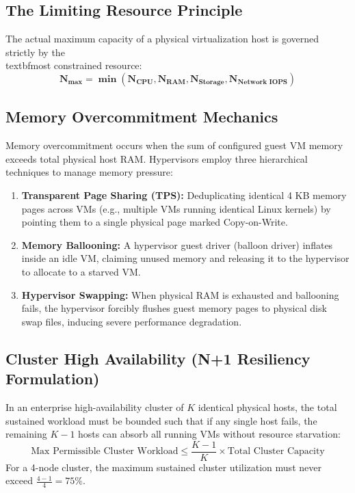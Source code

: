 \subsection{The Limiting Resource Principle}
The actual maximum capacity of a physical virtualization host is governed strictly by the \\textbf{most constrained resource}:
\begin{equation}
\label{eq:limiting_resource}
\mathbf{N_{\max} = \min\left(N_{\text{CPU}}, N_{\text{RAM}}, N_{\text{Storage}}, N_{\text{Network IOPS}}\right)}
\end{equation}

\subsection{Memory Overcommitment Mechanics}
Memory overcommitment occurs when the sum of configured guest VM memory exceeds total physical host RAM. Hypervisors employ three hierarchical techniques to manage memory pressure:
\begin{enumerate}
    \item \textbf{Transparent Page Sharing (TPS):} Deduplicating identical 4 KB memory pages across VMs (e.g., multiple VMs running identical Linux kernels) by pointing them to a single physical page marked Copy-on-Write.
    \item \textbf{Memory Ballooning:} A hypervisor guest driver (balloon driver) inflates inside an idle VM, claiming unused memory and releasing it to the hypervisor to allocate to a starved VM.
    \item \textbf{Hypervisor Swapping:} When physical RAM is exhausted and ballooning fails, the hypervisor forcibly flushes guest memory pages to physical disk swap files, inducing severe performance degradation.
\end{enumerate}

\subsection{Cluster High Availability (N+1 Resiliency Formulation)}
In an enterprise high-availability cluster of $K$ identical physical hosts, the total sustained workload must be bounded such that if any single host fails, the remaining $K-1$ hosts can absorb all running VMs without resource starvation:
\begin{equation}
\label{eq:n_plus_one_capacity}
\text{Max Permissible Cluster Workload} \le \frac{K - 1}{K} \times \text{Total Cluster Capacity}
\end{equation}
For a 4-node cluster, the maximum sustained cluster utilization must never exceed $\frac{4-1}{4} = 75\%$.



